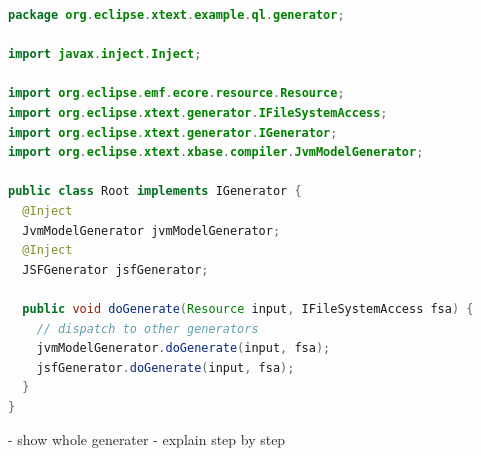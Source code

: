 \begin{lstlisting}[language=Java] 
 package org.eclipse.xtext.example.ql.generator;

import javax.inject.Inject;

import org.eclipse.emf.ecore.resource.Resource;
import org.eclipse.xtext.generator.IFileSystemAccess;
import org.eclipse.xtext.generator.IGenerator;
import org.eclipse.xtext.xbase.compiler.JvmModelGenerator;

public class Root implements IGenerator {
  @Inject
  JvmModelGenerator jvmModelGenerator;
  @Inject
  JSFGenerator jsfGenerator;

  public void doGenerate(Resource input, IFileSystemAccess fsa) {
    // dispatch to other generators
    jvmModelGenerator.doGenerate(input, fsa);
    jsfGenerator.doGenerate(input, fsa);
  }
}
\end{lstlisting}


- show whole generater
- explain step by step